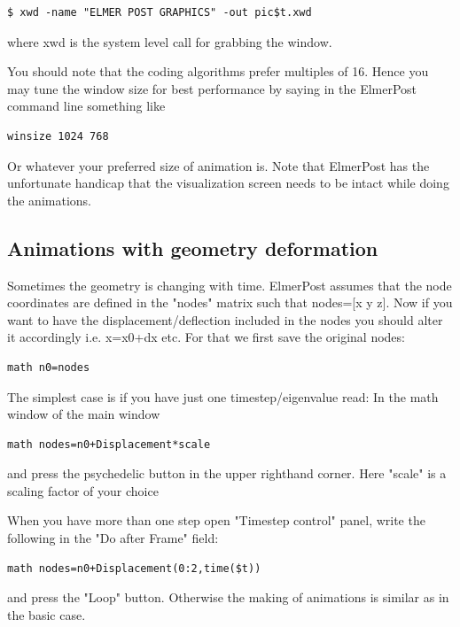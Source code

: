 \begin{verbatim}
$ xwd -name "ELMER POST GRAPHICS" -out pic$t.xwd
\end{verbatim}

where xwd is the system level call for grabbing the window.

You should note that the coding algorithms prefer multiples of 16. Hence you may tune the window size for best performance by saying in the ElmerPost command line something like

\begin{verbatim}
winsize 1024 768
\end{verbatim}

Or whatever your preferred size of animation is. Note that ElmerPost has the unfortunate handicap that the visualization screen needs to be intact while doing the animations.

\subsection{Animations with geometry deformation}

Sometimes the geometry is changing with time. ElmerPost assumes that the node coordinates are defined in the "nodes" matrix such that nodes=[x y z]. Now if you want to have the displacement/deflection included in the nodes you should alter it accordingly i.e. x=x0+dx etc. For that we first save the original nodes:

\begin{verbatim}
math n0=nodes
\end{verbatim}

The simplest case is if you have just one timestep/eigenvalue read: In the math window of the main window

\begin{verbatim}
math nodes=n0+Displacement*scale
\end{verbatim}

and press the psychedelic button in the upper righthand corner. Here "scale" is a scaling factor of your choice

When you have more than one step open "Timestep control" panel, write the following in the "Do after Frame" field:

\begin{verbatim}
math nodes=n0+Displacement(0:2,time($t))
\end{verbatim}

and press the "Loop" button. Otherwise the making of animations is similar as in the basic case.

